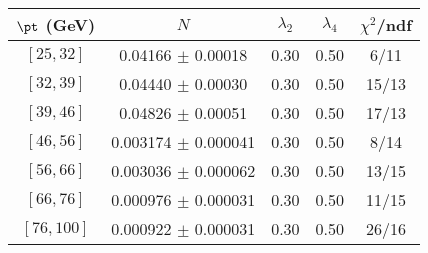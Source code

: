 \begin{tabular}{c||c|c|c|c}
$\pt$ (GeV) & $N$ & $\lambda_{2}$ & $\lambda_4$  & $\chi^2$/ndf  \\
\hline
$[25, 32]$ & 0.04166 $\pm$ 0.00018 & 0.30 & 0.50 & 6/11\\
$[32, 39]$ & 0.04440 $\pm$ 0.00030 & 0.30 & 0.50 & 15/13\\
$[39, 46]$ & 0.04826 $\pm$ 0.00051 & 0.30 & 0.50 & 17/13\\
$[46, 56]$ & 0.003174 $\pm$ 0.000041 & 0.30 & 0.50 & 8/14\\
$[56, 66]$ & 0.003036 $\pm$ 0.000062 & 0.30 & 0.50 & 13/15\\
$[66, 76]$ & 0.000976 $\pm$ 0.000031 & 0.30 & 0.50 & 11/15\\
$[76, 100]$ & 0.000922 $\pm$ 0.000031 & 0.30 & 0.50 & 26/16\\
\end{tabular}
